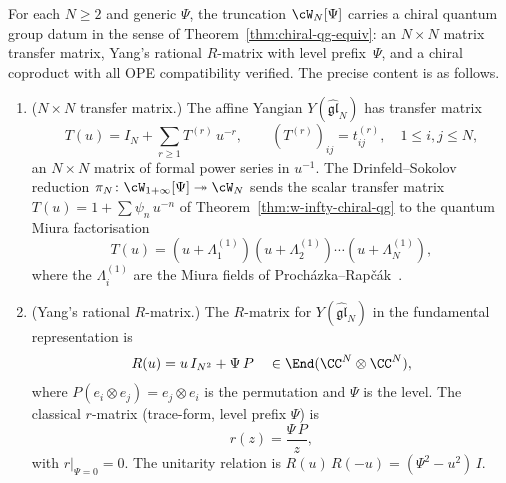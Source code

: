 \begin{theorem}
\label{thm:glN-chiral-qg}
For each $N \geq 2$ and generic $\Psi$, the truncation
$\cW_N[\Psi]$ carries a chiral quantum group datum in
the sense of
Theorem~\textup{\ref{thm:chiral-qg-equiv}}: an $N \times N$
matrix transfer matrix, Yang's rational $R$-matrix with
level prefix~$\Psi$, and a chiral coproduct with all
OPE compatibility verified.
The precise content is as follows.
\begin{enumerate}[label=\textup{(\Roman*)}]
\item \textup{($N \times N$ transfer matrix.)}
  The affine Yangian $Y(\widehat{\mathfrak{gl}}_N)$ has
  transfer matrix
  \begin{equation}\label{eq:glN-transfer}
    T(u)
    = I_N + \sum_{r \geq 1} T^{(r)}\, u^{-r},
    \qquad
    (T^{(r)})_{ij} = t_{ij}^{(r)},
    \quad 1 \leq i,j \leq N,
  \end{equation}
  an $N \times N$ matrix of formal power series in
  $u^{-1}$. The Drinfeld--Sokolov reduction
  $\pi_N \colon \cW_{1+\infty}[\Psi]
  \twoheadrightarrow \cW_N$ sends the scalar transfer
  matrix $T(u) = 1 + \sum \psi_n\, u^{-n}$ of
  Theorem~\textup{\ref{thm:w-infty-chiral-qg}}
  to the quantum Miura factorisation
  \begin{equation}\label{eq:glN-miura}
    T(u)
    = (u + \Lambda_1^{(1)})
    (u + \Lambda_2^{(1)})
    \cdots
    (u + \Lambda_N^{(1)}),
  \end{equation}
  where the $\Lambda_i^{(1)}$ are the Miura fields of
  Proch\'azka--Rap\v{c}\'ak~\textup{\cite{PR19}}.
\item \textup{(Yang's rational $R$-matrix.)}
  The $R$-matrix for $Y(\widehat{\mathfrak{gl}}_N)$
  in the fundamental representation is
  \begin{equation}\label{eq:glN-yang-r}
    R(u)
    = u\, I_{N^2} + \Psi\, P
    \quad \in \End(\CC^N \otimes \CC^N),
  \end{equation}
  where $P(e_i \otimes e_j) = e_j \otimes e_i$ is the
  permutation and $\Psi$ is the level.
  The classical $r$-matrix
  \textup{(}trace-form, level prefix
  $\Psi$\textup{)} is
  \begin{equation}\label{eq:glN-classical-r}
    r(z) = \frac{\Psi\, P}{z},
  \end{equation}
  with $r|_{\Psi = 0} = 0$. The unitarity relation is
  $R(u)\, R(-u) = (\Psi^2 - u^2)\, I$.

\end{enumerate}
\end{theorem}
